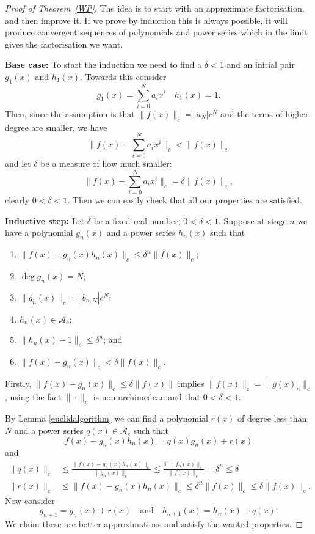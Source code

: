 \begin{proof}[Proof of Theorem~\ref{WP}]
    The idea is to start with an approximate factorisation, and then improve it. If we prove by
    induction this is always possible, it will produce convergent sequences of polynomials and power
    series which in the limit gives the factorisation we want.

    \textbf{Base case:}
    To start the induction we need to find a $\delta < 1$ and an initial pair $g_1 (x)$ and
    $h_1 (x)$. Towards this consider
    \[
    g_1 (x) = \sum^{N}_{i = 0} a_i x^i \quad h_1(x) = 1.
    \]
    Then, since the assumption is that $\|f(x)\|_c = |a_N |c^N$ and the terms of higher degree are
    smaller, we have
    \[
    \| f(x) - \sum_{i=0}^N a_i x^i\|_c < \|f(x)\|_c
    \]
    and let $\delta$ be a measure of how much smaller:
    \[
    \|f(x) - \sum_{i=0}^N a_i x^i \|_c = \delta \|f(x) \|_c,
    \]
    clearly $0 < \delta < 1$. Then we can easily check that all our properties are satisfied.

    \textbf{Inductive step:}
    Let $\delta$ be a fixed real number, $0 < \delta < 1$. Suppose at stage $n$ we have a polynomial
    $g_n (x)$ and a power series $h_n (x)$ such that
    \begin{enumerate}
        \item $\|f(x) - g_n (x) h_n(x) \|_c \leq \delta^n \|f(x)\|_c$;
        \item $\deg g_n (x) = N$;
        \item $\|g_n(x) \|_c = |b_{n,N} | c^N$;
        \item $h_n (x) \in \mathcal{A}_c$;
        \item $\| h_n(x) - 1 \|_c \leq \delta^n$; and
        \item $\|f (x) - g_n (x) \|_c < \delta \|f(x)\|_c.$
    \end{enumerate}

    Firstly, $\|f(x) - g_n (x) \|_c \leq \delta \|f(x) \|$ implies $ \| f(x) \|_c = \| g(x)_n \|_c$,
    using the fact $\| \cdot \|_c$ is non-archimedean and that $0 < \delta < 1$.

    By Lemma \ref{euclidalgorithm} we can find a polynomial $r(x)$ of degree less than $N$ and a
    power series $q(x) \in \mathcal{A}_c$ such that
    \[
    f(x) - g_n (x) h_n (x) = q(x) g_n(x) + r(x)
    \]
    and
    \begin{align*}
    \| q(x) \|_c & \leq \frac{\| f(x) - g_n (x) h_n (x) \|_c}{\| g_n (x) \|_c} \leq
    \frac{\delta^n \|f_n(x)\|_c}{\|f(x) \|_c} = \delta^n \leq \delta\\
    \| r(x) \|_c &\leq \| f(x) - g_n (x) h_n (x) \|_c \leq
    \delta^n \| f(x) \|_c \leq \delta \| f(x) \|_c.
    \end{align*}
    Now consider
    \[
    g_{n+1} = g_n (x) + r(x) \quad \text{and} \quad h_{n+1}(x) = h_n (x) + q(x).
    \]
    We claim these are better approximations and satisfy the wanted properties.


\end{proof}
